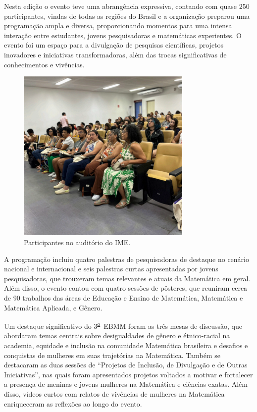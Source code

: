 \documentclass{hipatia}
\newcommand{\superou}{\textsuperscript{\underline{o}}~}
\begin{document}
Nesta edição o evento teve uma abrangência expressiva, contando com quase 250 participantes, vindas de todas as regiões do Brasil e a organização preparou uma programação ampla e diversa, proporcionando momentos para uma intensa interação entre estudantes, jovens pesquisadoras e matemáticas experientes. O evento foi um espaço para a divulgação de pesquisas científicas, projetos inovadores e iniciativas transformadoras, além das trocas significativas de conhecimentos e vivências.

\begin{figure}[htb]
    \centering
    \includegraphics[width=8.5cm]{EBMM4.png}
    \caption{Participantes no auditório do IME.}
 \label{EBMM4}
\end{figure}

A programação incluiu quatro palestras de pesquisadoras de destaque no cenário nacional e internacional e seis palestras curtas apresentadas por jovens pesquisadoras, que trouxeram temas relevantes e atuais da Matemática em geral. Além disso, o evento contou com quatro sessões de pôsteres, que reuniram cerca de 90 trabalhos das áreas de Educação e Ensino de Matemática, Matemática e Matemática Aplicada, e Gênero.

Um destaque significativo do 3\superou EBMM foram as três mesas de discussão, que abordaram temas centrais sobre desigualdades de gênero e étnico-racial na academia, equidade e inclusão na comunidade Matemática brasileira e desafios e conquistas de mulheres em suas trajetórias na Matemática. Também se destacaram as duas sessões de ``Projetos de Inclusão, de Divulgação e de Outras Iniciativas'', nas quais foram apresentados projetos voltados a motivar e fortalecer a presença de meninas e jovens mulheres na Matemática e ciências exatas. Além disso, vídeos curtos com relatos de vivências de mulheres na Matemática enriqueceram as reflexões ao longo do evento.
\end{document}
